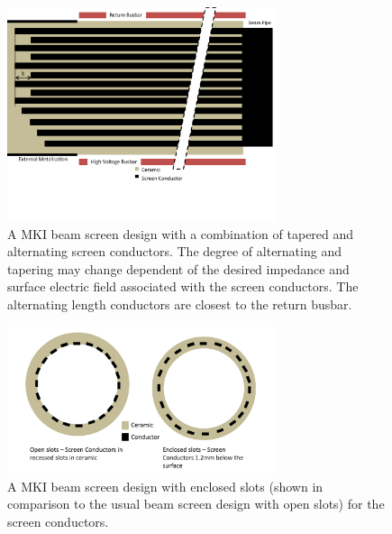 \begin{figure}
\begin{center}
\includegraphics[width=0.7\textwidth]{LHC_MKI/figures/mki-design-layouts/combination_layout.pdf}
\end{center}
\caption{A MKI beam screen design with a combination of tapered and alternating screen conductors. The degree of alternating and tapering may change dependent of the desired impedance and surface electric field associated with the screen conductors. The alternating length conductors are closest to the return busbar.}
\label{fig:24-alternating-tapered}
\end{figure}

\begin{figure}
\begin{center}
\includegraphics[width=0.7\textwidth]{LHC_MKI/figures/mki-design-layouts/enclosed_diagram.pdf}
\end{center}
\caption{A MKI beam screen design with enclosed slots (shown in comparison to the usual beam screen design with open slots) for the screen conductors.}
\label{fig:24-enclosed-slots}
\end{figure}

